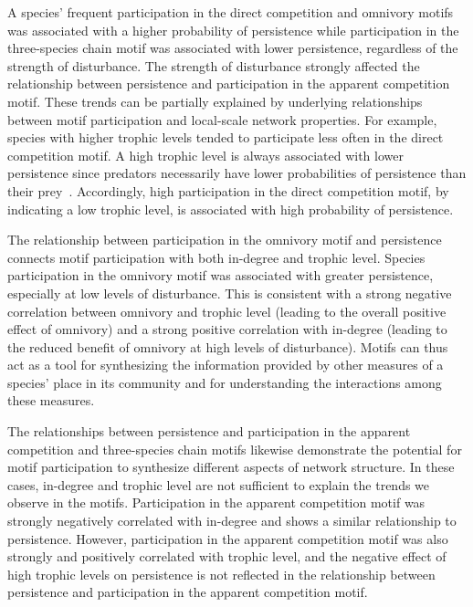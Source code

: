 \documentclass[12pt]{article}
\begin{document}
\begin{spacing}{2.0}
    
    A species' frequent participation in the direct competition and omnivory motifs was associated with a higher probability of persistence while participation in the three-species chain motif was associated with lower persistence, regardless of the strength of disturbance.
    The strength of disturbance strongly affected the relationship between persistence and participation in the apparent competition motif.
    These trends can be partially explained by underlying relationships between motif participation and local-scale network properties.
    For example, species with higher trophic levels tended to participate less often in the direct competition motif.
    A high trophic level is always associated with lower persistence since predators necessarily have lower probabilities of persistence than their prey~\citep{Eklof2013}.
    Accordingly, high participation in the direct competition motif, by indicating a low trophic level, is associated with high probability of persistence.
    
    
    The relationship between participation in the omnivory motif and persistence connects motif participation with both in-degree and trophic level.
    Species participation in the omnivory motif was associated with greater persistence, especially at low levels of disturbance.
    This is consistent with a strong negative correlation between omnivory and trophic level (leading to the overall positive effect of omnivory) and a strong positive correlation with in-degree (leading to the reduced benefit of omnivory at high levels of disturbance). 
    Motifs can thus act as a tool for synthesizing the information provided by other measures of a species' place in its community and for understanding the interactions among these measures.
    
    
    The relationships between persistence and participation in the apparent competition and three-species chain motifs likewise demonstrate the potential for motif participation to synthesize different aspects of network structure.
    In these cases, in-degree and trophic level are not sufficient to explain the trends we observe in the motifs.
    Participation in the apparent competition motif was strongly negatively correlated with in-degree and shows a similar relationship to persistence.
    However, participation in the apparent competition motif was also strongly and positively correlated with trophic level, and the negative effect of high trophic levels on persistence is not reflected in the relationship between persistence and participation in the apparent competition motif.
    

\end{spacing}
\end{document}
